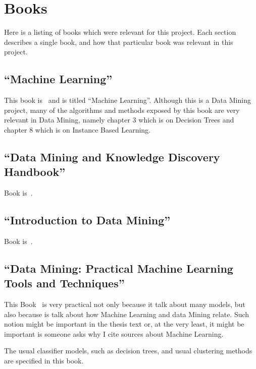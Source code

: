 \section{Books}

Here is a listing of books which were relevant for this project. Each section
describes a single book, and how that particular book was relevant in this
project.

\subsection{``Machine Learning''}

This book is~\cite{book_ml} and is titled ``Machine Learning''. Although this
is a Data Mining project, many of the algorithms and methods exposed by this
book are very relevant in Data Mining, namely chapter 3 which is on Decision
Trees and chapter 8 which is on Instance Based Learning.

\subsection{``Data Mining and Knowledge Discovery Handbook''}

Book is~\cite{book_dm_kdh}.~\TODO{}

\subsection{``Introduction to Data Mining''}

Book is~\cite{book_intro_dm}.~\TODO{}

\subsection{``Data Mining: Practical Machine Learning Tools and Techniques''}

This Book~\cite{book_dm_practical} is very practical not only because it talk
about many models, but also because is talk about how Machine Learning and data
Mining relate. Such notion might be important in the thesis text or, at the
very least, it might be important is someone asks why I cite sources about
Machine Learning.

The usual classifier models, such as decision trees, and usual clustering
methods are specified in this book.
